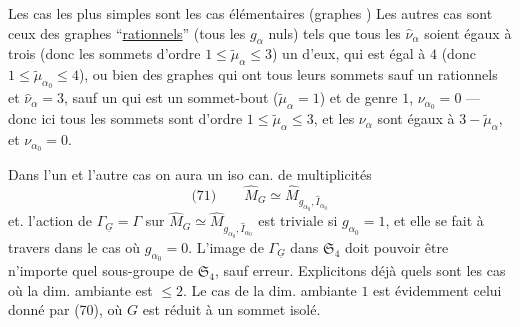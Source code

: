Les cas les plus simples sont les cas élémentaires (graphes  )
Les autres cas sont ceux des graphes ``\uline{rationnels}'' (tous les $g_\alpha$ nuls) tels que tous les $\widehat\nu_\alpha$ soient égaux à trois (donc les sommets d'ordre $1\leq\widetilde\mu_\alpha\leq3$)  un d'eux, qui est égal à $4$ (donc $1\leq\widetilde\mu_{\alpha_0}\leq4$), ou bien des graphes qui ont tous leurs sommets sauf un rationnels et $\widehat\nu_\alpha=3$,  sauf un  qui est un sommet-bout ($\widetilde\mu_\alpha=1$) et de genre $1$, $\nu_{\alpha_0}=0$ --- donc ici tous les sommets sont d'ordre $1\leq\widetilde\mu_\alpha\leq3$, et les $\nu_\alpha$  sont égaux à $3-\widetilde\mu_\alpha$,  et $\nu_{\alpha_0}=0$.

Dans l'un et l'autre cas  on aura un iso can. de multiplicités
\[
\text{(71)}\qquad\widehat M_G\simeq\widehat M_{g_{\alpha_0},\widehat I_{\alpha_0}}
\]
 et. l'action de $\Gamma_{\underline G}=\Gamma$ sur $\widehat M_G\simeq\widehat M_{g_{\alpha_0},\widehat I_{\alpha_0}}$ est triviale si $g_{\alpha_0}=1$, et elle se fait à travers
dans le cas où $g_{\alpha_0}=0$. L'image de $\Gamma_{\underline G}$ dans $\mathfrak S_4$ doit pouvoir être n'importe quel sous-groupe de $\mathfrak S_4$, sauf erreur. Explicitons déjà quels sont les cas où la dim. ambiante est $\leq2$. Le cas de la dim. ambiante $1$  est évidemment celui donné par (70), où $G$ est réduit à un sommet isolé.

